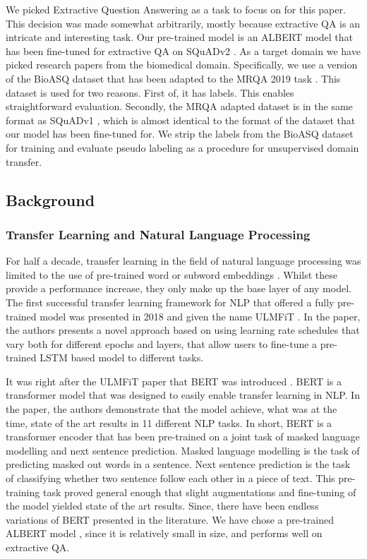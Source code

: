 \documentclass[twoside,twocolumn]{article}
\begin{document}
We picked Extractive Question Answering as a task to focus on for this
paper. This decision was made somewhat arbitrarily, mostly because extractive QA is an
intricate and interesting task. Our pre-trained model is an ALBERT model
\cite{lan2019albert} that
has been fine-tuned for extractive QA on SQuADv2 \cite{rajpurkar2018know}. As a target domain we have picked research
papers from the biomedical domain. Specifically, we use a version of the BioASQ
dataset that has been adapted to the MRQA 2019 task \cite{fisch2019mrqa}. This
dataset is used for two reasons. First of, it has labels. This enables
straightforward evaluation. Secondly, the MRQA adapted dataset is in the same
format as SQuADv1 \cite{rajpurkar2016squad} , which is almost identical to the format of the dataset that
our model has been fine-tuned for. We strip the labels from the BioASQ dataset
for training and evaluate pseudo labeling as a procedure for unsupervised domain
transfer.

\subsection{Background}
\subsubsection{Transfer Learning and Natural Language Processing}
For half a decade, transfer learning in the field of natural language processing
was limited to the use of pre-trained word or subword embeddings
\cite{mikolov2013distributed} \cite{pennington2014glove}. Whilst these provide a performance
increase, they only make up the base layer of any model. 
The first successful transfer learning framework for NLP that offered a fully
pre-trained model was presented in 2018 and given the name ULMFiT
\cite{howard2018universal}. In the paper, the authors presents a novel approach based on
using learning rate schedules that vary both for different epochs and layers,
that allow users to fine-tune a pre-trained LSTM based model to different tasks. 

It was right after the ULMFiT paper that BERT was introduced
\cite{devlin2018bert}. BERT is a transformer model \cite{vaswani2017attention} that was designed to easily
enable transfer learning in NLP. In the paper, the authors demonstrate that the
model achieve, what was at the time, state of the art results in 11 different
NLP tasks. In short, BERT is a transformer encoder that has been pre-trained on
a joint task of masked language modelling and next sentence prediction. Masked
language modelling is the task of predicting masked out words in a sentence.
Next sentence prediction is the task of classifying whether two sentence follow
each other in a piece of text. This pre-training task proved general enough
that slight augmentations and fine-tuning of the model yielded state of the art
results. Since, there have been endless variations of BERT presented in the
literature. We have chose a pre-trained ALBERT model \cite{lan2019albert}, since
it is relatively small in size, and performs well on extractive QA.
\end{document}
